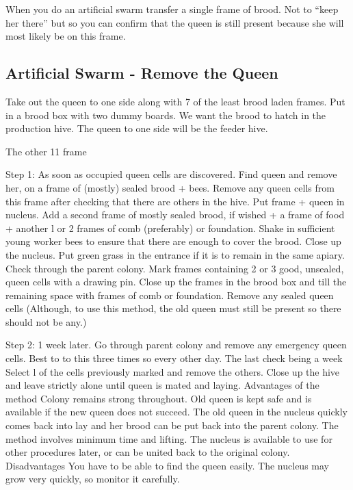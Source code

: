 \documentclass[12pt, a4paper, twoside, british]{article}
\begin{document}
When you do an artificial swarm transfer a single frame of brood.  
Not to “keep her there” but so you can confirm that the queen is still present because she will most likely be on this frame.


\subsection{Artificial Swarm - Remove the Queen}

Take out the queen to one side along with 7 of the least brood laden frames.  
Put in a brood box with two dummy boards.
We want the brood to hatch in the production hive.
The queen to one side will be the feeder hive.

The other 11 frame





Step 1: As soon as occupied queen cells are discovered.
Find queen and remove her, on a frame of (mostly) sealed brood + bees. Remove any queen cells from this frame after checking that there are others in the hive.
Put frame + queen in nucleus.
Add a second frame of mostly sealed brood, if wished + a frame of food + another l or 2
frames of comb (preferably) or foundation.
Shake in sufficient young worker bees to ensure that there are enough to cover the brood.
Close up the nucleus. Put green grass in the entrance if it is to remain in the same apiary.
Check through the parent colony.  Mark frames containing 2 or 3 good, unsealed, queen cells with a drawing pin.
Close up the frames in the brood box and till the remaining space with frames of comb or foundation.
Remove any sealed queen cells (Although, to use this method, the old queen must still be present so there should not be any.)
 
Step 2: 1 week later.
Go through parent colony and remove any emergency queen cells.  Best to to this three times so every other day.  The last check being a week
Select l of the cells previously marked and remove the others.
Close up the hive and leave strictly alone until queen is mated and laying.
Advantages of the method
Colony remains strong throughout.
Old queen is kept safe and is available if the new queen does not succeed.
The old queen in the nucleus quickly comes back into lay and her brood can be put back into the parent colony.
The method involves minimum time and lifting.
The nucleus is available to use for other procedures later, or can be united back to the original colony.
Disadvantages
You have to be able to find the queen easily.
The nucleus may grow very quickly, so monitor it carefully.
 
\end{document}
